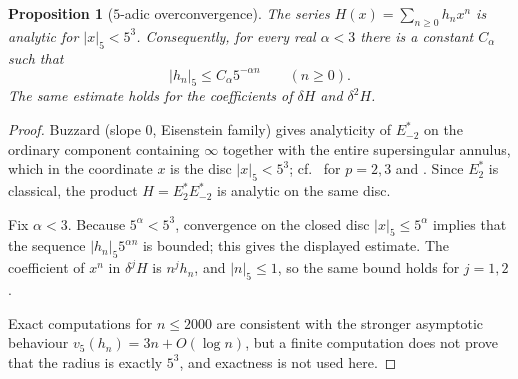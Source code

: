 \documentclass[11pt]{amsart}
\newtheorem{proposition}[theorem]{Proposition}
\theoremstyle{remark}
\begin{document}
\begin{proposition}[$5$-adic overconvergence]\label{padic-overconv}
The series $H(x)=\sum_{n\ge0}h_nx^n$ is analytic for $|x|_5<5^3$. Consequently, for every real $\alpha<3$ there is a constant $C_\alpha$ such that
\[|h_n|_5\le C_\alpha 5^{-\alpha n}\qquad(n\ge0).\]
The same estimate holds for the coefficients of $\delta H$ and $\delta^2H$.
\end{proposition}
\begin{proof}
Buzzard \cite[Thm.~5.2]{Buz03} (slope $0$, Eisenstein family) gives analyticity of $E^*_{-2}$ on the ordinary component containing $\infty$ together with the entire supersingular annulus, which in the coordinate $x$ is the disc $|x|_5<5^3$; cf.\ \cite[\S3]{Cal05} for $p=2,3$ and \cite[\S6.2]{CDTicm}. Since $E_2^*$ is classical, the product $H=E_2^*E^*_{-2}$ is analytic on the same disc.

Fix $\alpha<3$. Because $5^\alpha<5^3$, convergence on the closed disc $|x|_5\le5^\alpha$ implies that the sequence $|h_n|_5 5^{\alpha n}$ is bounded; this gives the displayed estimate. The coefficient of $x^n$ in $\delta^jH$ is $n^jh_n$, and $|n|_5\le1$, so the same bound holds for $j=1,2$.

Exact computations for $n\le2000$ are consistent with the stronger asymptotic behaviour $v_5(h_n)=3n+O(\log n)$, but a finite computation does not prove that the radius is exactly $5^3$, and exactness is not used here.
\end{proof}
\end{document}
